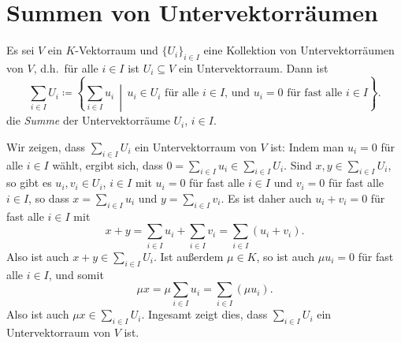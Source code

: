 \section{Summen von Untervektorräumen}

\begin{defi}
 Es sei $V$ ein $K$-Vektorraum und $\{U_i\}_{i \in I}$ eine Kollektion von Untervektorräumen von $V$, d.h.\ für alle $i \in I$ ist $U_i \subseteq V$ ein Untervektorraum. Dann ist
 \[
  \sum_{i \in I} U_i
  \coloneqq
  \left\{
   \sum_{i \in I} u_i
   \,\middle|\,
   \text{$u_i \in U_i$ für alle $i \in I$, und $u_i = 0$ für fast alle $i \in I$}
  \right\}.
 \]
 die \emph{Summe} der Untervektorräume $U_i$, $i \in I$.
\end{defi}

Wir zeigen, dass $\sum_{i \in I} U_i$ ein Untervektorraum von $V$ ist: Indem man $u_i = 0$ für alle $i \in I$ wählt, ergibt sich, dass $0 = \sum_{i \in I} u_i \in \sum_{i \in I} U_i$. Sind $x,y \in \sum_{i \in I} U_i$, so gibt es $u_i, v_i \in U_i$, $i \in I$ mit $u_i = 0$ für fast alle $i \in I$ und $v_i = 0$ für fast alle $i \in I$, so dass $x = \sum_{i \in I} u_i$ und $y = \sum_{i \in I} v_i$. Es ist daher auch $u_i + v_i = 0$ für fast alle $i \in I$ mit
\[
 x + y
 = \sum_{i \in I} u_i + \sum_{i \in I} v_i
 = \sum_{i \in I} (u_i + v_i).
\]
Also ist auch $x+y \in \sum_{i \in I} U_i$. Ist außerdem $\mu \in K$, so ist auch $\mu u_i = 0$ für fast alle $i \in I$, und somit
\[
 \mu x
 = \mu \sum_{i \in I} u_i
 = \sum_{i \in I} (\mu u_i).
\]
Also ist auch $\mu x \in \sum_{i \in I} U_i$. Ingesamt zeigt dies, dass $\sum_{i \in I} U_i$ ein Untervektorraum von $V$ ist.


